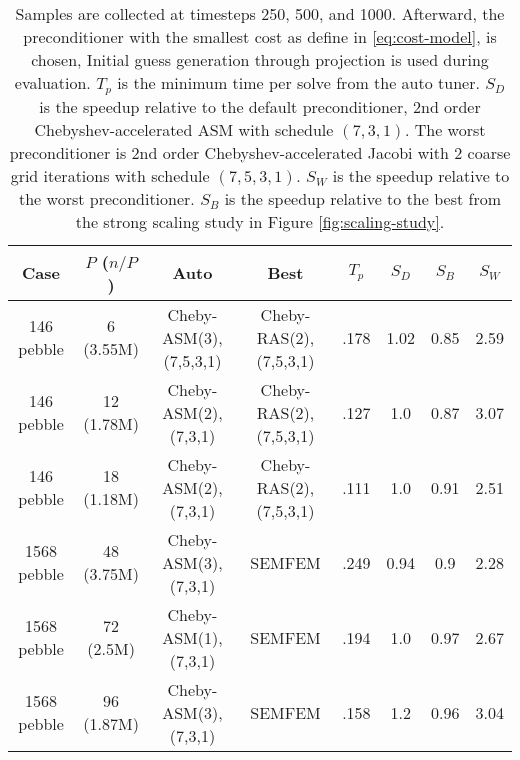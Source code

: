 \begin{table*} \footnotesize
\centering
\begin{tabular}{||c|| c| c| c| c| c| c| c||}
  \hline
  Case & $P$ ($n/P$) & Auto & Best & $T_p$ & $S_D$ & $S_B$ & $S_W$\\
  \hline\hline
  146 pebble  & 6  (3.55M) & Cheby-ASM(3),(7,5,3,1) & Cheby-RAS(2),(7,5,3,1) & .178 & 1.02 & 0.85   & 2.59\\
  146 pebble  & 12 (1.78M) & Cheby-ASM(2),(7,3,1)   & Cheby-RAS(2),(7,5,3,1) & .127 & 1.0  & 0.87   & 3.07\\
  146 pebble  & 18 (1.18M) & Cheby-ASM(2),(7,3,1)   & Cheby-RAS(2),(7,5,3,1) & .111 & 1.0  & 0.91   & 2.51\\
  \hline
  1568 pebble & 48 (3.75M) & Cheby-ASM(3),(7,3,1)   & SEMFEM                 & .249 & 0.94 & 0.9    & 2.28\\
  1568 pebble & 72 (2.5M)  & Cheby-ASM(1),(7,3,1)   & SEMFEM                 & .194 & 1.0  & 0.97   & 2.67\\
  1568 pebble & 96 (1.87M) & Cheby-ASM(3),(7,3,1)   & SEMFEM                 & .158 & 1.2  & 0.96   & 3.04\\
\hline
\end{tabular}
\caption{
  \small
  Samples are collected at timesteps 250, 500, and 1000.
  Afterward, the preconditioner with the smallest cost as define in \ref{eq:cost-model},
  is chosen,
  Initial guess generation through projection is used during evaluation.
  $T_p$ is the minimum time per solve from the auto tuner.
  $S_D$ is the speedup relative to the default preconditioner,
  2nd order Chebyshev-accelerated ASM with schedule $(7,3,1)$.
  The worst preconditioner is 2nd order Chebyshev-accelerated Jacobi with 2
  coarse grid iterations with schedule $(7,5,3,1)$.
  $S_W$ is the speedup relative to the worst preconditioner.
  $S_B$ is the speedup relative to the best from the strong scaling study
  in Figure \ref{fig:scaling-study}.
  \label{table:auto-preco-proj}}
\end{table*}